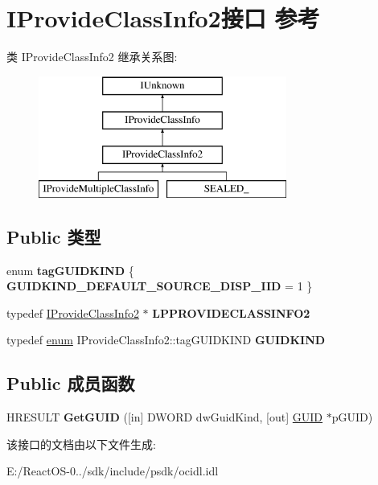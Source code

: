 \hypertarget{interface_i_provide_class_info2}{}\section{I\+Provide\+Class\+Info2接口 参考}
\label{interface_i_provide_class_info2}
类 I\+Provide\+Class\+Info2 继承关系图\+:\begin{figure}[H]
\begin{center}
\leavevmode
\includegraphics[height=4.000000cm]{interface_i_provide_class_info2}
\end{center}
\end{figure}
\subsection*{Public 类型}
\begin{DoxyCompactItemize}
\item 
\mbox{\label{interface_i_provide_class_info2_ab3bc2fc8c283e11d6f139bb0ecca399a}} 
enum {\bfseries tag\+G\+U\+I\+D\+K\+I\+ND} \{ {\bfseries G\+U\+I\+D\+K\+I\+N\+D\+\_\+\+D\+E\+F\+A\+U\+L\+T\+\_\+\+S\+O\+U\+R\+C\+E\+\_\+\+D\+I\+S\+P\+\_\+\+I\+ID} = 1
 \}
\item 
\mbox{\label{interface_i_provide_class_info2_a3b20ec3ef493b9970eaa259c4cef62ba}} 
typedef \hyperlink{interface_i_provide_class_info2}{I\+Provide\+Class\+Info2} $\ast$ {\bfseries L\+P\+P\+R\+O\+V\+I\+D\+E\+C\+L\+A\+S\+S\+I\+N\+F\+O2}
\item 
\mbox{\label{interface_i_provide_class_info2_a0e9febfcdea1c3beba5bead3f769bbd5}} 
typedef \hyperlink{interfaceenum}{enum} I\+Provide\+Class\+Info2\+::tag\+G\+U\+I\+D\+K\+I\+ND {\bfseries G\+U\+I\+D\+K\+I\+ND}
\end{DoxyCompactItemize}
\subsection*{Public 成员函数}
\begin{DoxyCompactItemize}
\item 
\mbox{\label{interface_i_provide_class_info2_a9a308de2d3a3ea434d8630e920d1fd87}} 
H\+R\+E\+S\+U\+LT {\bfseries Get\+G\+U\+ID} (\mbox{[}in\mbox{]} D\+W\+O\+RD dw\+Guid\+Kind, \mbox{[}out\mbox{]} \hyperlink{interface_g_u_i_d}{G\+U\+ID} $\ast$p\+G\+U\+ID)
\end{DoxyCompactItemize}


该接口的文档由以下文件生成\+:\begin{DoxyCompactItemize}
\item 
E\+:/\+React\+O\+S-\/0../sdk/include/psdk/ocidl.\+idl\end{DoxyCompactItemize}
